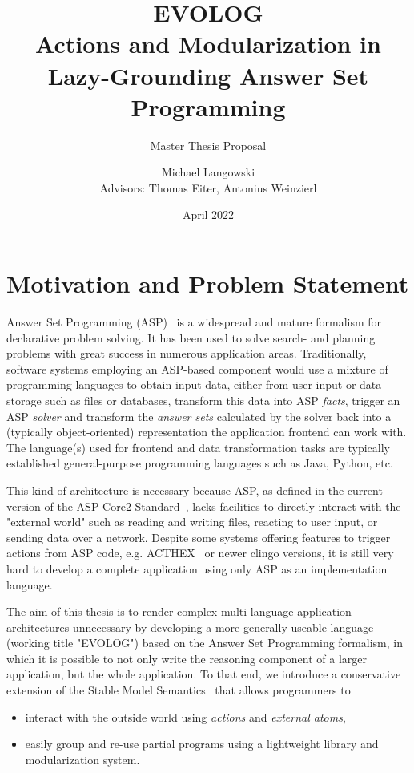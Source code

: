 \documentclass[12pt, letterpaper, twoside]{scrartcl}
\title{EVOLOG \\ Actions and Modularization in Lazy-Grounding Answer Set Programming}
\subtitle{Master Thesis Proposal}
\author{Michael Langowski \\ Advisors: Thomas Eiter, Antonius Weinzierl}
\date{April 2022}
\begin{document}
\begin{titlepage}
\maketitle
\end{titlepage}

\section{Motivation and Problem Statement}
\label{sec:motivation}

Answer Set Programming (ASP)~\cite{asp-primer} is a widespread and mature formalism for declarative problem solving. It has been used to solve search- and planning problems with great success in numerous application areas. Traditionally, software systems employing an ASP-based component would use a mixture of programming languages to obtain input data, either from user input or data storage such as files or databases, transform this data into ASP \emph{facts}, trigger an ASP \emph{solver} and transform the \emph{answer sets} calculated by the solver back into a (typically object-oriented) representation the application frontend can work with. The language(s) used for frontend and data transformation tasks are typically established general-purpose programming languages such as Java, Python, etc.

This kind of architecture is necessary because ASP, as defined in the current version of the ASP-Core2 Standard~\cite{asp-core2}, lacks facilities to directly interact with the "external world" such as reading and writing files, reacting to user input, or sending data over a network. Despite some systems offering features to trigger actions from ASP code, e.g. ACTHEX~\cite{acthex} or newer clingo versions, it is still very hard to develop a complete application using only ASP as an implementation language.

The aim of this thesis is to render complex multi-language application architectures unnecessary by developing a more generally useable language (working title "EVOLOG") based on the Answer Set Programming formalism, in which it is possible to not only write the reasoning component of a larger application, but the whole application. To that end, we introduce a conservative extension of the Stable Model Semantics~\cite{stable-models} that allows programmers to
\begin{itemize}
	\item interact with the outside world using \emph{actions} and \emph{external atoms},
	\item easily group and re-use partial programs using a lightweight library and modularization system.
\end{itemize}
\end{document}
